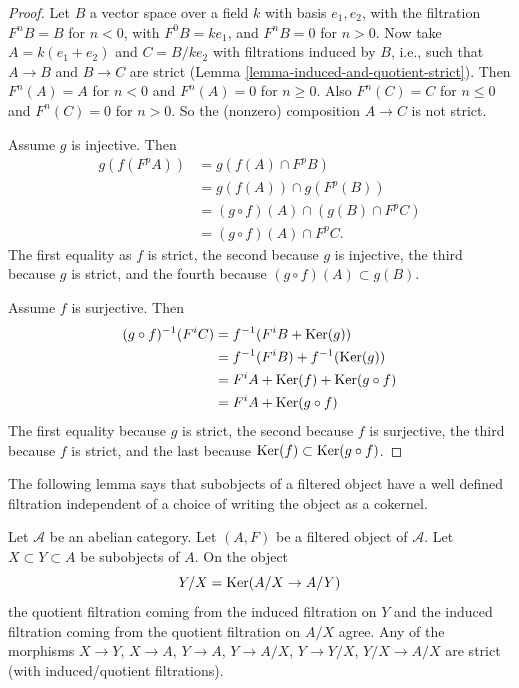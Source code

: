 \begin{proof}
Let $B$ a vector space over a field $k$ with basis $e_1, e_2$, with the
filtration $F^nB = B$ for $n < 0$, with $F^0B = ke_1$, and $F^nB = 0$ for
$n > 0$. Now take $A = k(e_1 + e_2)$ and $C = B/ke_2$ with filtrations
induced by $B$, i.e., such that $A \to B$ and $B \to C$ are strict
(Lemma \ref{lemma-induced-and-quotient-strict}).
Then $F^n(A) = A$ for $n < 0$ and $F^n(A) = 0$ for $n \geq 0$. 
Also $F^n(C) = C$ for $n \leq 0$ and $F^n(C) = 0$ for $n > 0$.
So the (nonzero) composition $A \to C$ is not strict.

\medskip\noindent
Assume $g$ is injective. Then
\begin{align*}
g(f(F^pA)) & = g(f(A) \cap F^pB) \\
& = g(f(A)) \cap g(F^p(B)) \\
& = (g \circ f)(A) \cap (g(B) \cap F^pC) \\
& = (g \circ f)(A) \cap F^pC.
\end{align*}
The first equality as $f$ is strict, the second because $g$ is injective,
the third because $g$ is strict, and the fourth because
$(g \circ f)(A) \subset g(B)$.

\medskip\noindent
Assume $f$ is surjective. Then
\begin{align*}
(g \circ f)^{-1}(F^iC) & = f^{-1}(F^iB + \mathop{\mathrm{Ker}}(g)) \\
& = f^{-1}(F^iB) + f^{-1}(\mathop{\mathrm{Ker}}(g)) \\
& = F^iA + \mathop{\mathrm{Ker}}(f) + \mathop{\mathrm{Ker}}(g \circ f) \\
& = F^iA + \mathop{\mathrm{Ker}}(g \circ f)
\end{align*}
The first equality because $g$ is strict, the second because $f$ is
surjective, the third because $f$ is strict, and the last because
$\mathop{\mathrm{Ker}}(f) \subset \mathop{\mathrm{Ker}}(g \circ f)$.
\end{proof}

\noindent
The following lemma says that subobjects of a filtered object have a well
defined filtration independent of a choice of writing the object as a
cokernel.

\begin{lemma}
\label{lemma-filtration-subobject}
Let $\mathcal{A}$ be an abelian category.
Let $(A, F)$ be a filtered object of $\mathcal{A}$.
Let $X \subset Y \subset A$ be subobjects of $A$.
On the object
$$
Y/X = \mathop{\mathrm{Ker}}(A/X \to A/Y)
$$
the quotient filtration coming from the induced filtration on $Y$ and the
induced filtration coming from the quotient filtration on $A/X$ agree.
Any of the morphisms $X \to Y$, $X \to A$, $Y \to A$, $Y \to A/X$,
$Y \to Y/X$, $Y/X \to A/X$ are strict (with induced/quotient filtrations).
\end{lemma}

